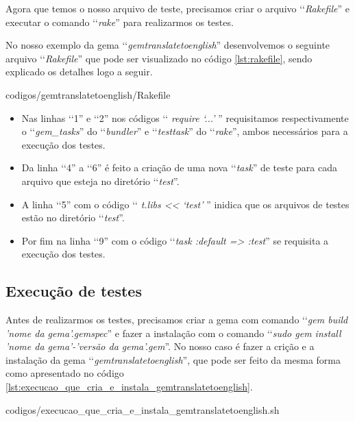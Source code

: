 Agora que temos o nosso arquivo de teste, precisamos criar o arquivo ‘‘\emph{Rakefile}'' e executar o 
comando ‘‘\emph{rake}'' para realizarmos os testes.

No nosso exemplo da gema ‘‘\emph{gemtranslatetoenglish}'' desenvolvemos o seguinte arquivo 
‘‘\emph{Rakefile}'' que pode ser visualizado no código \ref{lst:rakefile}, sendo explicado os detalhes
logo a seguir.


{codigos/gemtranslatetoenglish/Rakefile}

\begin{itemize}

\item Nas linhas ‘‘1'' e ‘‘2'' nos códigos ‘‘ \emph{require ‘...'} '' requisitamos respectivamente o 
 ‘‘\emph{gem\_tasks}'' do ‘‘\emph{bundler}'' e ‘‘\emph{testtask}'' do ‘‘\emph{rake}'', ambos necessários para
 a execução dos testes.
 
 \item Da linha ‘‘4'' a ‘‘6'' é feito a criação de uma nova ‘‘\emph{task}'' de teste para cada arquivo 
 que esteja no diretório ‘‘\emph{test}''.
 
 \item A linha ‘‘5'' com o código ‘‘ \emph{t.libs << ‘test'} '' inidica que os arquivos de testes estão no 
 diretório ‘‘\emph{test}''.

 \item Por fim na linha ‘‘9'' com o código ‘‘\emph{task :default => :test}'' se requisita a execução 
 dos testes.
 
\end{itemize}

\subsection{Execução de testes}
\label{subsection:execução_de_testes}

Antes de realizarmos os testes, precisamos criar a gema com comando ‘‘\emph{gem build 'nome da gema'.gemspec}'' 
e fazer a instalação com o comando ‘‘\emph{sudo gem install 'nome da gema'-'versão da gema'.gem}''. No nosso 
caso é fazer a crição e a instalação da gema ‘‘\emph{gemtranslatetoenglish}'', que pode ser feito da mesma 
forma como apresentado no código \ref{lst:execucao_que_cria_e_instala_gemtranslatetoenglish}.


{codigos/execucao_que_cria_e_instala_gemtranslatetoenglish.sh }

